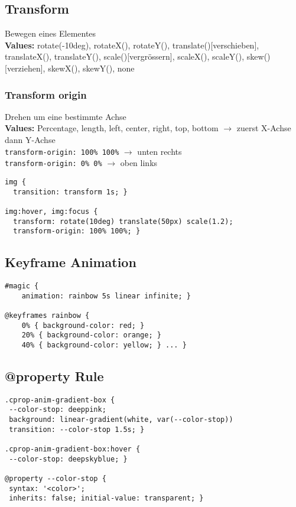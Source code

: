 \subsection{Transform}
Bewegen eines Elementes\\
\textbf{Values:} rotate(-10deg), rotateX(), rotateY(),  translate()[verschieben], translateX(), translateY(), scale()[vergrössern], scaleX(), scaleY(), skew()[verziehen], skewX(), skewY(), none
\subsubsection{Transform origin}
Drehen um eine bestimmte Achse\\
\textbf{Values:} Percentage, length, left, center, right, top, bottom $\rightarrow$ zuerst X-Achse dann Y-Achse \\
\texttt{transform-origin: 100\% 100\%} $\rightarrow$ unten rechts\\
\texttt{transform-origin: 0\% 0\%} $\rightarrow$ oben links

\begin{lstlisting}
img {
  transition: transform 1s; }

img:hover, img:focus {
  transform: rotate(10deg) translate(50px) scale(1.2);
  transform-origin: 100% 100%; }
\end{lstlisting}

\subsection{Keyframe Animation}
\begin{lstlisting}
#magic {
    animation: rainbow 5s linear infinite; }
    
@keyframes rainbow {
    0% { background-color: red; }
    20% { background-color: orange; }
    40% { background-color: yellow; } ... }
\end{lstlisting}

\subsection{@property Rule}
\begin{lstlisting}
.cprop-anim-gradient-box {
 --color-stop: deeppink; 
 background: linear-gradient(white, var(--color-stop))
 transition: --color-stop 1.5s; }

.cprop-anim-gradient-box:hover {
 --color-stop: deepskyblue; }

@property --color-stop { 
 syntax: '<color>';
 inherits: false; initial-value: transparent; }
\end{lstlisting}

